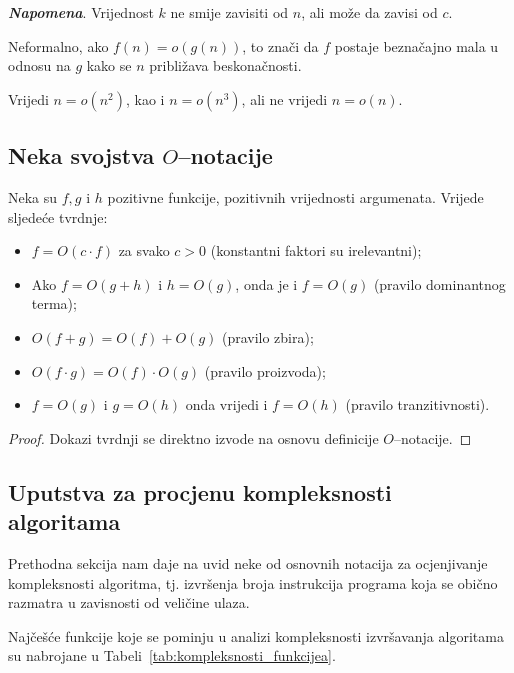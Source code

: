 \noindent \textbf{\textit{Napomena}}. Vrijednost $k$ ne smije zavisiti od $n$, ali može da zavisi od $c$.

Neformalno, ako $f(n) = o(g(n))$, to znači da  $f$ postaje beznačajno mala u odnosu na $g$ kako se $n$ približava beskonačnosti.

\begin{example}
    Vrijedi $n = o(n^2)$, kao i $n = o(n^3)$, ali ne vrijedi $n = o(n)$. 
\end{example}

\subsection{Neka svojstva $O$--notacije}

\begin{theorem} Neka su $f, g$ i $h$ pozitivne funkcije, pozitivnih vrijednosti argumenata.  Vrijede sljedeće tvrdnje:
	\begin{itemize}
		\item 	  $f = O(c \cdot f)$ za svako $c > 0$ (konstantni faktori su irelevantni);
		\item Ako $f = O(g +  h)$ i $h = O(g)$, onda je i $f = O(g)$  (pravilo dominantnog terma);
		\item $O(f + g) = O(f)  + O(g)$ (pravilo zbira);
		\item $O( f \cdot g) = O(f) \cdot O(g)$ (pravilo proizvoda);
        \item $f = O(g)$ i $g = O(h)$ onda
        vrijedi i $f = O(h)$ (pravilo tranzitivnosti). 
	\end{itemize}
 
\end{theorem}

\begin{proof}
	Dokazi tvrdnji se direktno izvode na osnovu definicije $O$--notacije.
\end{proof}

\subsection{Uputstva za procjenu kompleksnosti algoritama}

Prethodna sekcija nam daje na uvid neke od osnovnih notacija za ocjenjivanje kompleksnosti   algoritma, tj. izvršenja broja instrukcija programa koja se obično razmatra u zavisnosti od veličine ulaza. 

 Najčešće funkcije koje se pominju u analizi kompleksnosti izvršavanja algoritama su nabrojane u Tabeli~\ref{tab:kompleksnosti_funkcijea}. 
 
